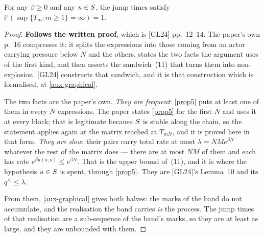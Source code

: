 \begin{theorem}[Existence]
  \label{thm1-1}
  \leanok
  For any $\beta \ge 0$ and any $u \in S$, the jump times satisfy
  $\mathbb{P}(\sup\{T_m : m \ge 1\} = \infty) = 1$.
\end{theorem}
\begin{proof}
  \leanok
  \textbf{Follows the written proof}, which is [GL24] pp.~12--14.  The paper's own
  p.~16 compresses it: it splits the expressions into those coming from an actor
  carrying pressure below $N$ and the others, states the two facts the argument
  uses of the first kind, and then asserts the sandwich~(11) that turns them into
  non-explosion.  [GL24] constructs that sandwich, and it is that construction
  which is formalised, at \ref{aux-graphical}.

  The two facts are the paper's own.  \emph{They are frequent}: \ref{prop5} puts
  at least one of them in every $N$ expressions.  The paper states \ref{prop5} for
  the first $N$ and uses it at every block; that is legitimate because $S$ is
  stable along the chain, so the statement applies again at the matrix reached at
  $T_{mN}$, and it is proved here in that form.  \emph{They are slow}: their pairs
  carry total rate at most $\lambda = NMe^{\beta N}$ whatever the rest of the
  matrix does --- there are at most $NM$ of them and each has rate $e^{\beta
  u(a,o)} \le e^{\beta N}$.  That is the upper bound of~(11), and it is where the
  hypothesis $u \in S$ is spent, through \ref{prop5}.  They are [GL24]'s
  Lemma~10 and its $q^< \le \lambda$.

  From them, \ref{aux-graphical} gives both halves: the marks of the band do not
  accumulate, and the realisation the band carries \emph{is} the process.  The
  jump times of that realisation are a sub-sequence of the band's marks, so they
  are at least as large, and they are unbounded with them.


\end{proof}
